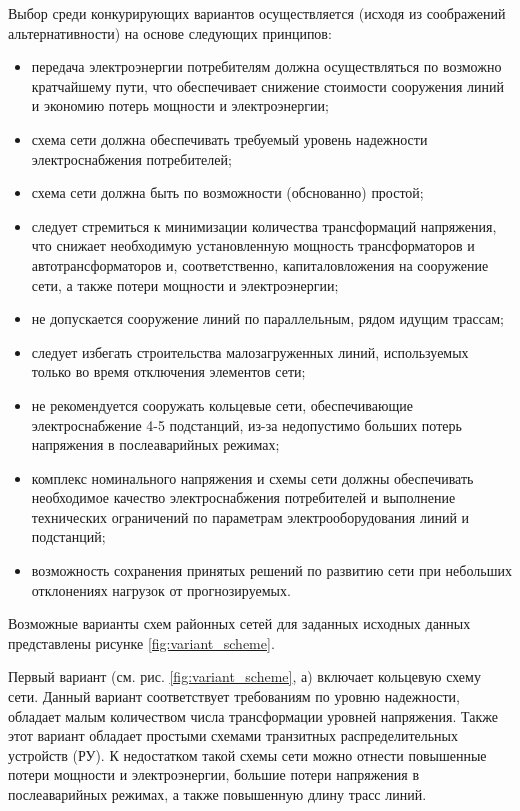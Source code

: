 Выбор среди конкурирующих вариантов осуществляется (исходя из соображений альтернативности) на основе следующих принципов:
\begin{itemize}
	\item передача электроэнергии потребителям должна осуществляться по возможно кратчайшему пути, что обеспечивает снижение стоимости сооружения линий и экономию потерь мощности и электроэнергии;
	\item схема сети должна обеспечивать требуемый уровень надежности электроснабжения потребителей;
	\item схема сети должна быть по возможности (обснованно) простой;
	\item следует стремиться к минимизации количества трансформаций напряжения, что снижает необходимую установленную мощность трансформаторов и автотрансформаторов и, соответственно, капиталовложения на сооружение сети, а также потери мощности и электроэнергии;
	\item не допускается сооружение линий по параллельным, рядом идущим трассам;
	\item следует избегать строительства малозагруженных линий, используемых только во время отключения элементов сети;
	\item не рекомендуется сооружать кольцевые сети, обеспечивающие электроснабжение 4-5 подстанций, из-за недопустимо больших потерь напряжения в послеаварийных режимах;
	\item комплекс номинального напряжения и схемы сети должны обеспечивать необходимое качество электроснабжения потребителей и выполнение технических ограничений по параметрам электрооборудования линий и подстанций;
	\item возможность сохранения принятых решений по развитию сети при небольших отклонениях нагрузок от прогнозируемых.
\end{itemize}

Возможные варианты схем районных сетей для заданных исходных данных представлены рисунке \ref{fig:variant_scheme}.

Первый вариант (см. рис. \ref{fig:variant_scheme}, а) включает кольцевую схему сети. Данный вариант соответствует требованиям по уровню надежности, обладает малым количеством числа трансформации уровней напряжения. Также этот вариант обладает простыми схемами транзитных распределительных устройств (РУ). К недостатком такой схемы сети можно отнести повышенные потери мощности и электроэнергии, большие потери напряжения в послеаварийных режимах, а также повышенную длину трасс линий.

